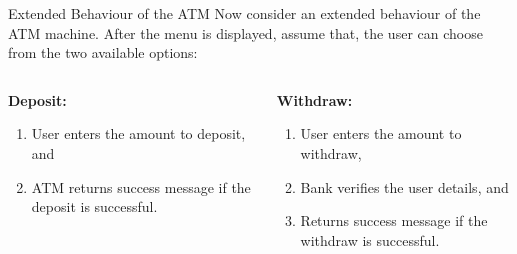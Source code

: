 \documentclass[10pt]{beamer}
\theoremstyle{plain}
\theoremstyle{definition}
\begin{document}
\begin{frame}{Extended Behaviour of the ATM}
	Now consider an extended behaviour of the ATM machine. After the menu is displayed, assume that, the user can choose from the two available options:
	\vspace{0.5cm}
	\begin{columns}[T]
		\begin{column}{0.4\textwidth}
			\textbf{Deposit:}
			\begin{enumerate}
				\item User enters the amount to deposit, and
				\item ATM returns success message if the deposit is successful.
			\end{enumerate}
		\end{column}
		\begin{column}{0.51\textwidth}
			\textbf{Withdraw:}
			\begin{enumerate}
				\item User enters the amount to withdraw,
				\item Bank verifies the user details, and
				\item Returns success message if the withdraw is successful.
			\end{enumerate}
		\end{column}
	\end{columns}
\end{frame}
\end{document}
